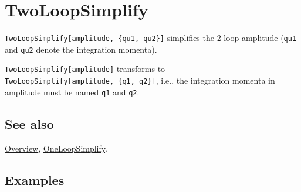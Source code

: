 \documentclass[../FeynCalcManual.tex]{subfiles}
\begin{document}
\hypertarget{twoloopsimplify}{
\section{TwoLoopSimplify}\label{twoloopsimplify}}

\texttt{TwoLoopSimplify[\allowbreak{}amplitude,\ \allowbreak{}\{\allowbreak{}qu1,\ \allowbreak{}qu2\}]}
simplifies the 2-loop amplitude (\texttt{qu1} and \texttt{qu2} denote
the integration momenta).

\texttt{TwoLoopSimplify[\allowbreak{}amplitude]} transforms to
\texttt{TwoLoopSimplify[\allowbreak{}amplitude,\ \allowbreak{}\{\allowbreak{}q1,\ \allowbreak{}q2\}]},
i.e., the integration momenta in amplitude must be named \texttt{q1} and
\texttt{q2}.

\subsection{See also}

\hyperlink{toc}{Overview}, \hyperlink{oneloopsimplify}{OneLoopSimplify}.

\subsection{Examples}
\end{document}
